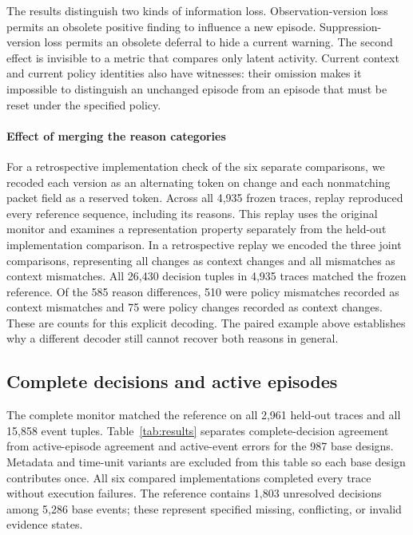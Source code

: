 \documentclass[preprint,11pt]{elsarticle}
\begin{document}
The results distinguish two kinds of information loss. Observation-version loss permits an obsolete positive finding to influence a new episode. Suppression-version loss permits an obsolete deferral to hide a current warning. The second effect is invisible to a metric that compares only latent activity. Current context and current policy identities also have witnesses: their omission makes it impossible to distinguish an unchanged episode from an episode that must be reset under the specified policy.

\paragraph{Effect of merging the reason categories}
For a retrospective implementation check of the six separate comparisons, we recoded each version as an alternating token on change and each nonmatching packet field as a reserved token. Across all 4,935 frozen traces, replay reproduced every reference sequence, including its reasons. This replay uses the original monitor and examines a representation property separately from the held-out implementation comparison.
In a retrospective replay we encoded the three joint comparisons, representing all changes as context changes and all mismatches as context mismatches. All 26,430 decision tuples in 4,935 traces matched the frozen reference. Of the 585 reason differences, 510 were policy mismatches recorded as context mismatches and 75 were policy changes recorded as context changes. These are counts for this explicit decoding. The paired example above establishes why a different decoder still cannot recover both reasons in general.

\subsection{Complete decisions and active episodes}
\label{sec:agreements}
The complete monitor matched the reference on all 2,961 held-out traces and all 15,858 event tuples. Table~\ref{tab:results} separates complete-decision agreement from active-episode agreement and active-event errors for the 987 base designs. Metadata and time-unit variants are excluded from this table so each base design contributes once. All six compared implementations completed every trace without execution failures. The reference contains 1,803 unresolved decisions among 5,286 base events; these represent specified missing, conflicting, or invalid evidence states.
\end{document}
